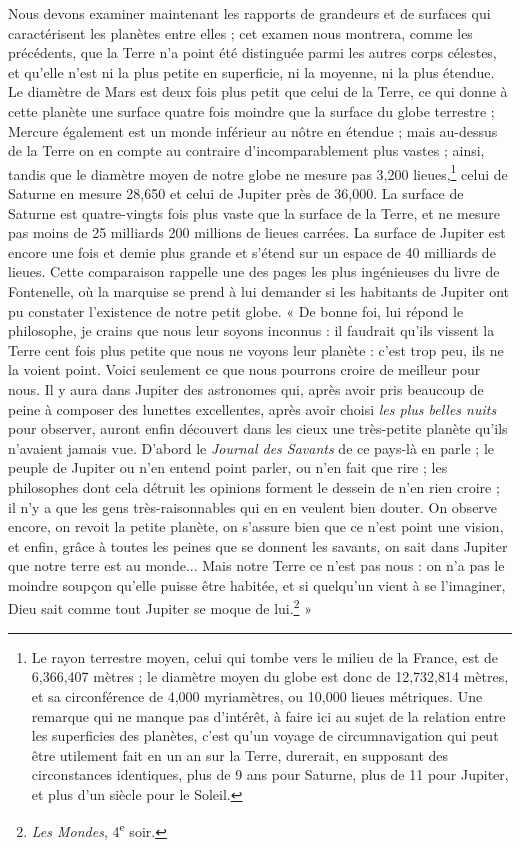 \documentclass[a4paper, 11pt, oneside]{article}
\begin{document}
Nous devons examiner maintenant les rapports de grandeurs et de surfaces qui caractérisent les planètes entre elles ; cet examen nous montrera, comme les précédents, que la Terre n'a point été distinguée parmi les autres corps célestes, et qu'elle n'est ni la plus petite en superficie, ni la moyenne, ni la plus étendue. Le diamètre de Mars est deux fois plus petit que celui de la Terre, ce qui donne à cette planète une surface quatre fois moindre que la surface du globe terrestre ; Mercure également est un monde inférieur au nôtre en étendue ; mais au-dessus de la Terre on en compte au contraire d'incomparablement plus vastes ; ainsi, tandis que le diamètre moyen de notre globe ne mesure pas 3,200 lieues,\footnote{Le rayon terrestre moyen, celui qui tombe vers le milieu de la France, est de 6,366,407 mètres ; le diamètre moyen du globe est donc de 12,732,814 mètres, et sa circonférence de 4,000 myriamètres, ou 10,000 lieues métriques. Une remarque qui ne manque pas d'intérêt, à faire ici au sujet de la relation entre les superficies des planètes, c'est qu'un voyage de circumnavigation qui peut être utilement fait en un an sur la Terre, durerait, en supposant des circonstances identiques, plus de 9 ans pour Saturne, plus de 11 pour Jupiter, et plus d'un siècle pour le Soleil.} celui de Saturne en mesure 28,650 et celui de Jupiter près de 36,000. La surface de Saturne est quatre-vingts fois plus vaste que la surface de la Terre, et ne mesure pas moins de 25 milliards 200 millions de lieues carrées. La surface de Jupiter est encore une fois et demie plus grande et s'étend sur un espace de 40 milliards de lieues. Cette comparaison rappelle une des pages les plus ingénieuses du livre de Fontenelle, où la marquise se prend à lui demander si les habitants de Jupiter ont pu constater l'existence de notre petit globe. « De bonne foi, lui répond le philosophe, je crains que nous leur soyons inconnus : il faudrait qu'ils vissent la Terre cent fois plus petite que nous ne voyons leur planète : c'est trop peu, ils ne la voient point. Voici seulement ce que nous pourrons croire de meilleur pour nous. Il y aura dans Jupiter des astronomes qui, après avoir pris beaucoup de peine à composer des lunettes excellentes, après avoir choisi \emph{les plus belles nuits} pour observer, auront enfin découvert dans les cieux une très-petite planète qu'ils n'avaient jamais vue. D'abord le \emph{Journal des Savants} de ce pays-là en parle ; le peuple de Jupiter ou n'en entend point parler, ou n'en fait que rire ; les philosophes dont cela détruit les opinions forment le dessein de n'en rien croire ; il n'y a que les gens très-raisonnables qui en en veulent bien douter. On observe encore, on revoit la petite planète, on s'assure bien que ce n'est point une vision, et enfin, grâce à toutes les peines que se donnent les savants, on sait dans Jupiter que notre terre est au monde... Mais notre Terre ce n'est pas nous : on n'a pas le moindre soupçon qu'elle puisse être habitée, et si quelqu'un vient à se l'imaginer, Dieu sait comme tout Jupiter se moque de lui.\footnote{\emph{Les Mondes}, 4\textsuperscript{e} soir.} »
\end{document}
